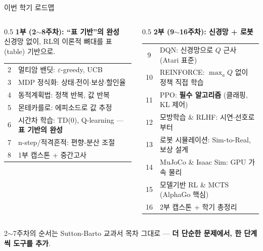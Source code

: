 \begin{frame}{이번 학기 로드맵}
  
  \begin{columns}[T]
    \begin{column}{0.5\textwidth}
      \textbf{\color{ksablue}1부 (2$\sim$8주차): ``표 기반''의 완성} \\
      신경망 없이, RL의 이론적 뼈대를 표(table) 기반으로.
      \begin{tabular}{@{}cl@{}}
        \toprule
        2 & 멀티암 밴딧: $\varepsilon$-greedy, UCB \\
        3 & MDP 정식화: 상태$\cdot$전이$\cdot$보상$\cdot$\mbox{할인율} \\
        4 & 동적계획법: 정책 반복, 값 반복 \\
        5 & 몬테카를로: 에피소드로 값 추정 \\
        6 & 시간차 학습: TD(0), Q-learning --- \textbf{표 기반의 완성} \\
        7 & n-step/적격흔적: 편향-분산 조절 \\
        8 & 1부 캡스톤 + 중간고사 \\
        \bottomrule
      \end{tabular}
    \end{column}
    \begin{column}{0.5\textwidth}
      \textbf{\color{ksablue}2부 (9$\sim$16주차): 신경망 + 로봇} \\
      \begin{tabular}{@{}cl@{}}
        \toprule
        9 & DQN: 신경망으로 $Q$ 근사 (Atari 표준) \\
        10 & REINFORCE: $\max_a Q$ 없이 정책 직접 학습 \\
        11 & PPO: \textbf{필수 알고리즘} (클래핑, KL 제어) \\
        12 & 모방학습 \& RLHF: 시연$\cdot$선호로부터 \\
        13 & 로봇 시뮬레이션: Sim-to-Real, 보상 설계 \\
        14 & MuJoCo \& Isaac Sim: GPU 가속 물리 \\
        15 & 모델기반 RL \& MCTS (AlphaGo 핵심) \\
        16 & 2부 캡스톤 + 학기 총정리 \\
        \bottomrule
      \end{tabular}
    \end{column}
  \end{columns}
  {\footnotesize 2$\sim$7주차의 순서는 Sutton-Barto 교과서 목차 그대로 ---
  \textbf{더 단순한 문제에서, 한 단계씩 도구를 추가}.}

\end{frame}
